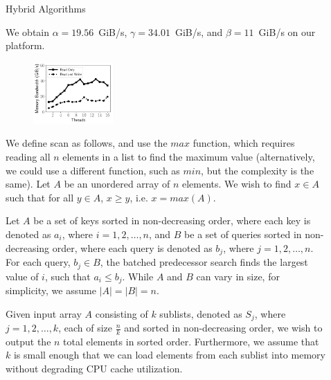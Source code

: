 \documentclass[final]{beamer}
\newlength{\sepwidth}
\newlength{\colwidth}
\newcommand{\separatorcolumn}{\begin{column}{\sepwidth}\end{column}}
\begin{document}
\begin{frame}[t]
\begin{columns}[t]
\begin{column}{\colwidth}
\begin{block}{Hybrid Algorithms}
\begin{description}[font=$\bullet$~\normalfont\scshape\color{red!50!black}]
\item We obtain $\alpha=19.56$~GiB/s, $\gamma=34.01$~GiB/s, and $\beta=11$~GiB/s on our platform. 
\end{description} 

\begin{figure}[htp]
\centering
    \includegraphics[height=0.2\textwidth, width=0.30\textwidth, trim={0.5cm 0.5cm 0.5cm 1cm}]{figures/microbenchmarks_time_vs_threads.pdf}	
   \label{fig:mem_bandwidth_scalability}
\end{figure}


We define scan as follows, and use the $max$ function, which requires reading all $n$ elements in a list to find the maximum value (alternatively,
we could use a different function, such as $min$, but the complexity is the same).
Let $A$ be an unordered array of $n$ elements. We wish to find $x \in A$ such that for all $y \in A$, $x \ge y$, i.e. $x = max(A)$.


   Let $A$ be a set of keys sorted in non-decreasing order,  
   where each key is denoted as $a_i$, where $i=1, 2,\ldots,n$, and $B$ be a set of queries sorted in non-decreasing order, 
   where each query is denoted as $b_j$, where $j=1, 2,\ldots,n$. For each query, $b_j\in B$, the batched predecessor search 
   finds the largest value of $i$, such that $a_i\leq b_j$. While $A$ and $B$ can vary in size, for simplicity, we assume $|A|=|B|=n$.


   Given input array $A$ consisting of $k$ sublists, denoted as $S_j$, 
   where $j=1, 2,\ldots,k$, each of size  $\frac{n}{k}$ and sorted in non-decreasing order, we wish to output the $n$ total elements 
   in sorted order. Furthermore, we assume that $k$ is small enough that we can load elements 
   from each sublist into memory without degrading CPU cache utilization.

  \end{block}

\end{column}

\separatorcolumn

\begin{column}{\colwidth}


\end{column}
\end{columns}
\end{frame}
\end{document}
